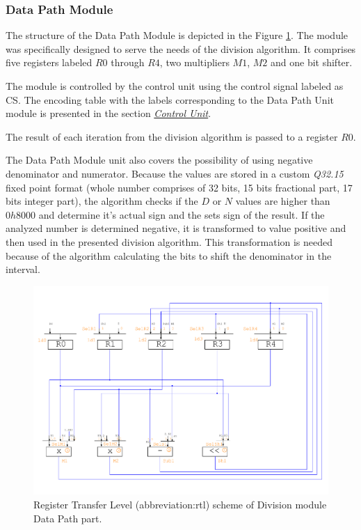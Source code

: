 \documentclass[a4paper, twoside, 11pt]{article}
\begin{document}
\subsubsection{Data Path Module}
The structure of the Data Path Module is depicted in the Figure \ref{fig:division-rtl}. The module was specifically designed to serve the needs of the division algorithm. It comprises five registers labeled $R0$ through $R4$, two multipliers $M1$, $M2$ and one bit shifter.\par
The module is controlled by the control unit using the control signal labeled as CS. The encoding table with the labels corresponding to the Data Path Unit module is presented in the section \hyperref[subsubsec:division-control-unit]{\textit{Control Unit}}.\par
The result of each iteration from the division algorithm is passed to a register $R0$.\par
The Data Path Module unit also covers the possibility of using negative denominator and numerator. Because the values are stored in a custom \textit{Q32.15} fixed point format (whole number comprises of 32 bits, 15 bits fractional part, 17 bits integer part), the algorithm checks if the $D$ or $N$ values are higher than $0h8000$ and determine it's actual sign and the sets sign of the result. If the analyzed number is determined negative, it is transformed to value positive and then used in the presented division algorithm. This transformation is needed because of the algorithm calculating the bits to shift the denominator in the interval.
\begin{figure}[htbp!]
  \centering
  \includegraphics[width=1\textwidth]{src/pdf/rtl.pdf}
    \caption{Register Transfer Level (\gls{abbreviation:rtl}) scheme of Division module Data Path part.}
  \label{fig:division-rtl}
\end{figure}
\end{document}
